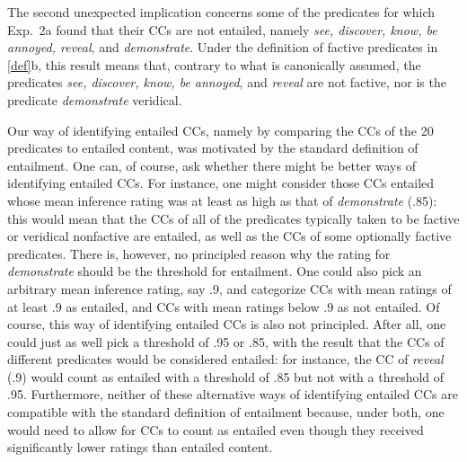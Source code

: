 \documentclass{language}
\newcommand{\6}{\mbox{$[\hspace*{-.6mm}[$}}
\newcommand{\9}{\mbox{$]\hspace*{-.6mm}]$}}
\begin{document}
The second unexpected implication concerns some of the predicates for which Exp.~2a found that their CCs are not entailed, namely {\em see, discover, know, be annoyed, reveal}, and {\em demonstrate}. Under the definition of factive predicates in \ref{def}b, this result means that, contrary to what is canonically assumed, the predicates {\em see, discover, know, be annoyed}, and {\em reveal} are not factive, nor is the predicate {\em demonstrate} veridical.

Our way of identifying entailed CCs, namely by comparing the CCs of the 20 predicates to entailed content, was motivated by the standard definition of entailment. One can, of course, ask whether there might be better ways of identifying entailed CCs. For instance, one might consider those CCs entailed whose mean inference rating was at least as high as that of {\em demonstrate} (.85): this would mean that the CCs of all of the predicates typically taken to be factive or veridical nonfactive are entailed, as well as the CCs of some optionally factive predicates. There is, however, no principled reason why the rating for {\em demonstrate} should be the threshold for entailment. One could also pick an arbitrary mean inference rating, say .9, and categorize CCs with mean ratings of at least .9 as entailed, and CCs with mean ratings below .9 as not entailed. Of course, this way of identifying entailed CCs is also not principled. After all, one could just as well pick a threshold of .95 or .85, with the result that the CCs of different predicates would be considered entailed: for instance, the CC of {\em reveal} (.9) would count as entailed with a threshold of .85 but not with a threshold of .95. Furthermore, neither of these alternative ways of identifying entailed CCs are compatible with the standard definition of entailment because, under both, one would need to allow for CCs to count as entailed even though they received significantly lower ratings than entailed content.

\end{document}
